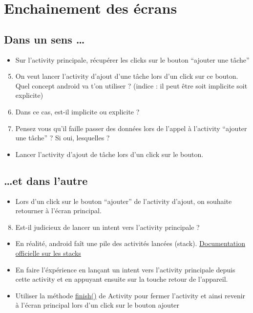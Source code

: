 \documentclass{article}
\begin{document}
\section{Enchainement des écrans}
\subsection{Dans un sens \ldots}
\begin{itemize}
  \item Sur l'activity principale, récupérer les clicks sur le bouton ``ajouter une tâche''
 \end{itemize}
\begin{enumerate}
 \setcounter{enumi}{4}
\item On veut lancer l'activity d'ajout d'une tâche lors d'un click sur ce bouton. Quel concept android va t'on utiliser ? 
(indice : il peut être soit implicite soit explicite)
\item Dans ce cas, est-il implicite ou explicite ?
\item Pensez vous qu'il faille passer des données lors de l'appel à l'activity ``ajouter une tâche'' ? Si oui, lesquelles ?
\end{enumerate}
\begin{itemize}
  \item Lancer l'activity d'ajout de tâche lors d'un click sur le bouton.
\end{itemize}
\subsection{\ldots et dans l'autre}

\begin{itemize}
  \item Lors d'un click sur le bouton ``ajouter'' de l'activity d'ajout, on souhaite retourner à l'écran principal.
 \end{itemize}
 \begin{enumerate}
 \setcounter{enumi}{7}
\item Est-il judicieux de lancer un intent vers l'activity principale ? 
\end{enumerate}
\begin{itemize}
  \item En réalité, android faît une pile des activités lancées (stack). \href{http://developer.android.com/guide/components/tasks-and-back-stack.html}{Documentation officielle sur les stacks} 
  \item En faire l'éxpérience en lançant un intent vers l'activity principale depuis cette activity et en appuyant ensuite sur la touche retour de l'appareil. 
  \item Utiliser la méthode \href{http://developer.android.com/reference/android/app/Activity.html#finish()}{finish()} de Activity pour fermer l'activity et ainsi revenir à l'écran principal lors d'un click sur le bouton ajouter 
 \end{itemize}
 
\end{document}
